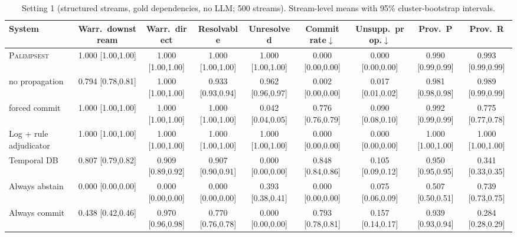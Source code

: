 \begin{table}\centering\footnotesize\setlength{\tabcolsep}{3.5pt}
\caption{Setting 1 (structured streams, gold dependencies, no LLM; 500 streams). Stream-level means with 95\% cluster-bootstrap intervals.}\label{tab:s1}
\begin{tabular}{lcccccccc}
\toprule
System & Warr.\ downstream & Warr.\ direct & Resolvable & Unresolved & Commit rate$\downarrow$ & Unsupp.\ prop.$\downarrow$ & Prov.\ P & Prov.\ R \\
\midrule
\textsc{Palimpsest} & 1.000 {\tiny[1.00,1.00]} & 1.000 {\tiny[1.00,1.00]} & 1.000 {\tiny[1.00,1.00]} & 1.000 {\tiny[1.00,1.00]} & 0.000 {\tiny[0.00,0.00]} & 0.000 {\tiny[0.00,0.00]} & 0.990 {\tiny[0.99,0.99]} & 0.993 {\tiny[0.99,0.99]} \\
\quad no propagation & 0.794 {\tiny[0.78,0.81]} & 1.000 {\tiny[1.00,1.00]} & 0.933 {\tiny[0.93,0.94]} & 0.962 {\tiny[0.96,0.97]} & 0.002 {\tiny[0.00,0.00]} & 0.017 {\tiny[0.01,0.02]} & 0.981 {\tiny[0.98,0.98]} & 0.989 {\tiny[0.99,0.99]} \\
\quad forced commit & 1.000 {\tiny[1.00,1.00]} & 1.000 {\tiny[1.00,1.00]} & 1.000 {\tiny[1.00,1.00]} & 0.042 {\tiny[0.04,0.05]} & 0.776 {\tiny[0.76,0.79]} & 0.090 {\tiny[0.08,0.10]} & 0.992 {\tiny[0.99,0.99]} & 0.775 {\tiny[0.77,0.78]} \\
Log + rule adjudicator & 1.000 {\tiny[1.00,1.00]} & 1.000 {\tiny[1.00,1.00]} & 1.000 {\tiny[1.00,1.00]} & 1.000 {\tiny[1.00,1.00]} & 0.000 {\tiny[0.00,0.00]} & 0.000 {\tiny[0.00,0.00]} & 1.000 {\tiny[1.00,1.00]} & 1.000 {\tiny[1.00,1.00]} \\
Temporal DB & 0.807 {\tiny[0.79,0.82]} & 0.909 {\tiny[0.89,0.92]} & 0.907 {\tiny[0.90,0.91]} & 0.000 {\tiny[0.00,0.00]} & 0.848 {\tiny[0.84,0.86]} & 0.105 {\tiny[0.09,0.12]} & 0.950 {\tiny[0.95,0.95]} & 0.341 {\tiny[0.33,0.35]} \\
Always abstain & 0.000 {\tiny[0.00,0.00]} & 0.000 {\tiny[0.00,0.00]} & 0.000 {\tiny[0.00,0.00]} & 0.393 {\tiny[0.38,0.41]} & 0.000 {\tiny[0.00,0.00]} & 0.075 {\tiny[0.06,0.09]} & 0.507 {\tiny[0.50,0.51]} & 0.739 {\tiny[0.73,0.75]} \\
Always commit & 0.438 {\tiny[0.42,0.46]} & 0.970 {\tiny[0.96,0.98]} & 0.770 {\tiny[0.76,0.78]} & 0.000 {\tiny[0.00,0.00]} & 0.793 {\tiny[0.78,0.81]} & 0.157 {\tiny[0.14,0.17]} & 0.939 {\tiny[0.93,0.94]} & 0.284 {\tiny[0.28,0.29]} \\
\bottomrule
\end{tabular}
\end{table}